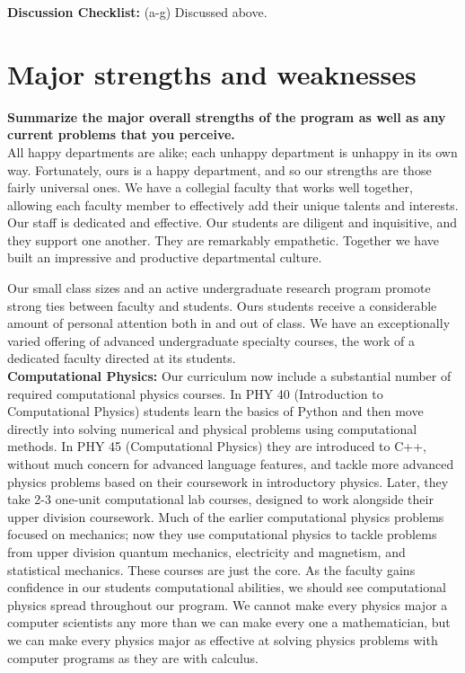 \documentclass[12pt]{article}
\begin{document}
\noindent
{\bf Discussion Checklist:} (a-g) Discussed above.

\newpage
\section{Major strengths and weaknesses}
\label{sec:snws}

{\bf Summarize the major overall strengths of the program as well as any current problems that 
you perceive.}\\[3pt]

\noindent
All happy departments are alike; each unhappy department is unhappy in
its own way.  Fortunately, ours is a happy department, and so our
strengths are those fairly universal ones.  We have a collegial
faculty that works well together, allowing each faculty member to
effectively add their unique talents and interests.  Our staff is
dedicated and effective.  Our students are diligent and inquisitive,
and they support one another.  They are remarkably empathetic.
Together we have built an impressive and productive departmental
culture.

Our small class sizes and an active undergraduate research program
promote strong ties between faculty and students.  Ours students
receive a considerable amount of personal attention both in and out of
class.  We have an exceptionally varied offering of advanced
undergraduate specialty courses, the work of a dedicated faculty
directed at its students.\\[3pt]

\noindent
{\bf Computational Physics:} Our curriculum now include a substantial
number of required computational physics courses.  In PHY 40
(Introduction to Computational Physics) students learn the basics of
Python and then move directly into solving numerical and physical
problems using computational methods.  In PHY 45 (Computational
Physics) they are introduced to C++, without much concern for advanced
language features, and tackle more advanced physics problems based on
their coursework in introductory physics.  Later, they take 2-3
one-unit computational lab courses, designed to work alongside their
upper division coursework.  Much of the earlier computational physics
problems focused on mechanics; now they use computational physics to
tackle problems from upper division quantum mechanics, electricity and
magnetism, and statistical mechanics. These courses are just the core.
As the faculty gains confidence in our students computational
abilities, we should see computational physics spread throughout our
program.  We cannot make every physics major a computer scientists any
more than we can make every one a mathematician, but we can make every
physics major as effective at solving physics problems with computer
programs as they are with calculus.\\[3pt]
\end{document}
